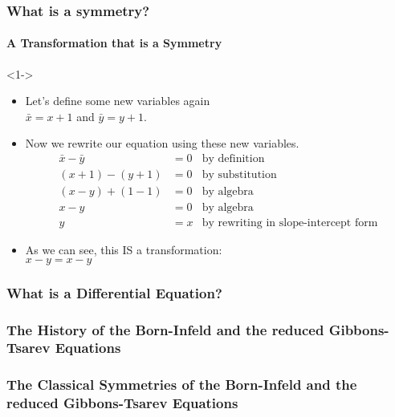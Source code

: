 \documentclass{beamer}
\begin{document}
\begin{frame}
    \frametitle{What is a symmetry?}
    \framesubtitle{A Transformation that is a Symmetry}
    \begin{example}[2]<1->
        \begin{itemize}
            \item Let's define some new variables again\\ $\bar{x}=x+1$ and $\bar{y}=y+1$.
            \item Now we rewrite our equation using these new variables. \begin{equation*}
                \begin{aligned}
                    \bar{x}-\bar{y} &= 0 & \text{by definition} \\
                    (x+1)-(y+1) &= 0 & \text{by substitution} \\
                    (x-y)+(1-1) &= 0 & \text{by algebra} \\
                    x-y &= 0 & \text{by algebra} \\
                    y &= x & \text{by rewriting in slope-intercept form}
                \end{aligned}
            \end{equation*}
            \item As we can see, this IS a transformation: \\ $x-y = x-y$
        \end{itemize}        
    \end{example}
\end{frame}




\begin{frame}
    \frametitle{What is a Differential Equation?}

\end{frame}



\begin{frame}
    \frametitle{The History of the Born-Infeld and the reduced Gibbons-Tsarev Equations}

\end{frame}



\begin{frame}
    \frametitle{The Classical Symmetries of the Born-Infeld and the reduced Gibbons-Tsarev Equations}

\end{frame}
\end{document}
